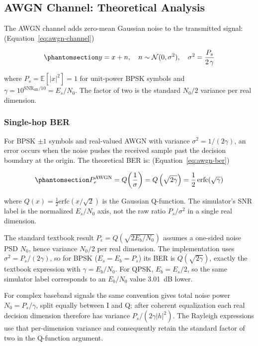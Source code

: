 \subsection{AWGN Channel: Theoretical Analysis}\label{sec:awgn-channel-theoretical-analysis}

The AWGN channel adds zero-mean Gaussian noise to the transmitted signal: (Equation~\ref{eq:awgn-channel})

\begin{equation}\protect\phantomsection\label{eq:awgn-channel}{y = x + n, \quad n \sim \mathcal{N}(0, \sigma^2), \quad \sigma^2 = \frac{P_s}{2\,\gamma}
}\end{equation}

where \(P_s = \mathbb{E}[|x|^2] = 1\) for unit-power BPSK symbols and \(\gamma=10^{\mathrm{SNR}_{\mathrm{dB}}/10}=E_s/N_0\). The factor of two is the standard \(N_0/2\) variance per real dimension.

\subsubsection{Single-hop BER}\label{sec:awgn-single-hop-ber}
 For BPSK \(\pm 1\) symbols and real-valued AWGN with variance \(\sigma^2 = 1/(2\gamma)\), an error occurs when the noise pushes the received sample past the decision boundary at the origin. The theoretical BER is: (Equation~\ref{eq:awgn-ber})

\begin{equation}\protect\phantomsection\label{eq:awgn-ber}{P_e^{\text{AWGN}} = Q\!\left(\frac{1}{\sigma}\right) = Q\left(\sqrt{2\gamma}\right) = \frac{1}{2}\,\text{erfc}\!\left(\sqrt{\gamma}\right)
}\end{equation}

where \(Q(x) = \frac{1}{2}\text{erfc}(x/\sqrt{2})\) is the Gaussian Q-function. The simulator's SNR label is the normalized \(E_s/N_0\) axis, not the raw ratio \(P_s/\sigma^2\) in a single real dimension.

\begin{remark}\label{noise-convension}
The standard textbook result \(P_e = Q(\sqrt{2 E_b/N_0})\) assumes a one-sided noise PSD \(N_0\), hence variance \(N_0/2\) per real dimension. The implementation uses \(\sigma^2=P_s/(2\gamma)\), so for BPSK (\(E_s=E_b=P_s\)) its BER is \(Q(\sqrt{2\gamma})\), exactly the textbook expression with \(\gamma=E_b/N_0\). For QPSK, \(E_b=E_s/2\), so the same simulator label corresponds to an \(E_b/N_0\) value 3.01~dB lower.

For complex baseband signals the same convention gives total noise power \(N_0=P_s/\gamma\), split equally between I and Q; after coherent equalization each real decision dimension therefore has variance \(P_s/(2\gamma|h|^2)\). The Rayleigh expressions use that per-dimension variance and consequently retain the standard factor of two in the Q-function argument.
\end{remark}

